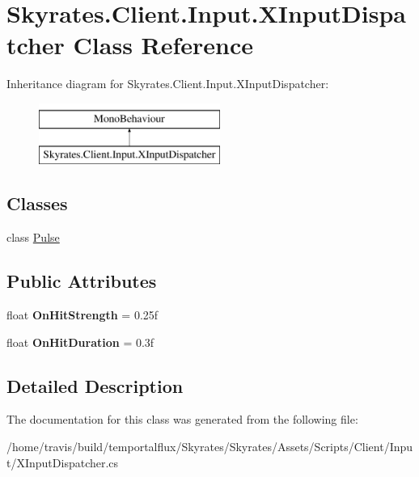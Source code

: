 \hypertarget{class_skyrates_1_1_client_1_1_input_1_1_x_input_dispatcher}{\section{Skyrates.\-Client.\-Input.\-X\-Input\-Dispatcher Class Reference}
\label{class_skyrates_1_1_client_1_1_input_1_1_x_input_dispatcher}
}


 


Inheritance diagram for Skyrates.\-Client.\-Input.\-X\-Input\-Dispatcher\-:\begin{figure}[H]
\begin{center}
\leavevmode
\includegraphics[height=2.000000cm]{class_skyrates_1_1_client_1_1_input_1_1_x_input_dispatcher}
\end{center}
\end{figure}
\subsection*{Classes}
\begin{DoxyCompactItemize}
\item 
class \hyperlink{class_skyrates_1_1_client_1_1_input_1_1_x_input_dispatcher_1_1_pulse}{Pulse}
\end{DoxyCompactItemize}
\subsection*{Public Attributes}
\begin{DoxyCompactItemize}
\item 
\hypertarget{class_skyrates_1_1_client_1_1_input_1_1_x_input_dispatcher_a5f7cd1e18bea1cbd99c5df7dd27d4804}{float {\bfseries On\-Hit\-Strength} = 0.\-25f}\label{class_skyrates_1_1_client_1_1_input_1_1_x_input_dispatcher_a5f7cd1e18bea1cbd99c5df7dd27d4804}

\item 
\hypertarget{class_skyrates_1_1_client_1_1_input_1_1_x_input_dispatcher_aebb6a36b42b636002a2ea32d6096ec31}{float {\bfseries On\-Hit\-Duration} = 0.\-3f}\label{class_skyrates_1_1_client_1_1_input_1_1_x_input_dispatcher_aebb6a36b42b636002a2ea32d6096ec31}

\end{DoxyCompactItemize}


\subsection{Detailed Description}




The documentation for this class was generated from the following file\-:\begin{DoxyCompactItemize}
\item 
/home/travis/build/temportalflux/\-Skyrates/\-Skyrates/\-Assets/\-Scripts/\-Client/\-Input/X\-Input\-Dispatcher.\-cs\end{DoxyCompactItemize}
